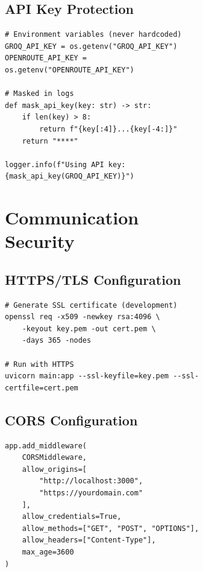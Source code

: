 \documentclass[12pt,a4paper]{report}
\begin{document}
\begin{figure}[H]
\begin{plantuml}
\begin{figure}[H]
\begin{plantuml}
\subsection{API Key Protection}

\begin{lstlisting}[style=pythonstyle, caption={Secret Management}]
# Environment variables (never hardcoded)
GROQ_API_KEY = os.getenv("GROQ_API_KEY")
OPENROUTE_API_KEY = os.getenv("OPENROUTE_API_KEY")

# Masked in logs
def mask_api_key(key: str) -> str:
    if len(key) > 8:
        return f"{key[:4]}...{key[-4:]}"
    return "****"

logger.info(f"Using API key: {mask_api_key(GROQ_API_KEY)}")
\end{lstlisting}

\section{Communication Security}

\subsection{HTTPS/TLS Configuration}

\begin{lstlisting}[style=bashStyle, caption={SSL Certificate Setup}]
# Generate SSL certificate (development)
openssl req -x509 -newkey rsa:4096 \
    -keyout key.pem -out cert.pem \
    -days 365 -nodes

# Run with HTTPS
uvicorn main:app --ssl-keyfile=key.pem --ssl-certfile=cert.pem
\end{lstlisting}

\subsection{CORS Configuration}

\begin{lstlisting}[style=pythonstyle, caption={CORS Middleware}]
app.add_middleware(
    CORSMiddleware,
    allow_origins=[
        "http://localhost:3000",
        "https://yourdomain.com"
    ],
    allow_credentials=True,
    allow_methods=["GET", "POST", "OPTIONS"],
    allow_headers=["Content-Type"],
    max_age=3600
)
\end{lstlisting}



\end{plantuml}
\end{figure}
\end{plantuml}
\end{figure}
\end{document}
